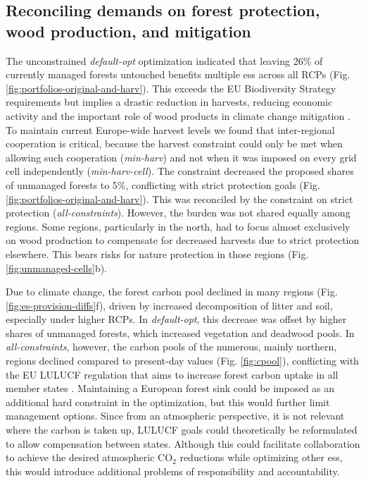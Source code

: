 \documentclass[]{article}
\newcommand{\coo}{\ensuremath{\mathrm{CO_2}}}
\begin{document}
\subsection{Reconciling demands on forest protection, wood production, and mitigation}

The unconstrained \textit{default-opt} optimization indicated that leaving 26\% of currently managed forests untouched benefits multiple \glspl{es} across all RCPs (Fig. \ref{fig:portfolios-original-and-harv}). This exceeds the EU Biodiversity Strategy requirements but implies a drastic reduction in harvests, reducing economic activity and the important role of wood products in climate change mitigation \parencite{Grassi2021, gregorQuantifyingImpactKey2024}.
To maintain current Europe-wide harvest levels we found that inter-regional cooperation is critical, because the harvest constraint could only be met when allowing such cooperation (\textit{min-harv}) and not when it was imposed on every grid cell independently (\textit{min-harv-cell}).
The constraint decreased the proposed shares of unmanaged forests to 5\%, conflicting with strict protection goals (Fig. \ref{fig:portfolios-original-and-harv}).
This was reconciled by the constraint on strict protection (\textit{all-constraints}). However, the burden was not shared equally among regions. Some regions, particularly in the north, had to focus almost exclusively on wood production to compensate for decreased harvests due to strict protection elsewhere. This bears risks for nature protection in those regions (Fig. \ref{fig:unmanaged-cells}b).


Due to climate change, the forest carbon pool declined in many regions (Fig. \ref{fig:es-provision-diffs}f), driven by increased decomposition of litter and soil, especially under higher RCPs. In \textit{default-opt}, this decrease was offset by higher shares of unmanaged forests, which increased vegetation and deadwood pools. In \textit{all-constraints}, however, the carbon pools of the numerous, mainly northern, regions declined compared to present-day values (Fig. \ref{fig:cpool}), conflicting with the EU LULUCF regulation that aims to increase forest carbon uptake in all member states \parencite[Fig. \ref{fig:es-provision-diffs};][]{EU2018LULUCF}.
Maintaining a European forest sink could be imposed as an additional hard constraint in the optimization, but this would further limit management options.
Since from an atmospheric perspective, it is not relevant where the carbon is taken up, LULUCF goals could theoretically be reformulated to allow compensation between states. Although this could facilitate collaboration to achieve the desired atmospheric \coo{} reductions while optimizing other \glspl{es}, this would introduce additional problems of responsibility and accountability.
\end{document}
